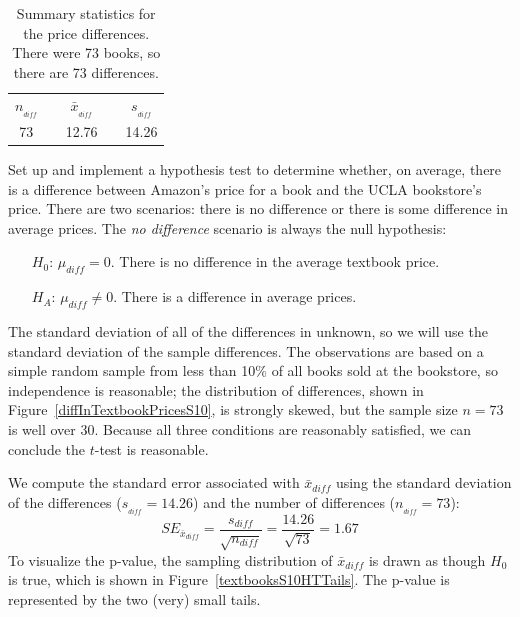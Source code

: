 \begin{table}[hh]
\centering
\begin{tabular}{ccccc}
\hline
$n_{_{diff}}$	&\hspace{3mm}& $\bar{x}_{_{diff}}$	&\hspace{3mm}& $s_{_{diff}}$ \vspace{1mm}\\
73			&& 12.76				&& 14.26 \\
\hline
\end{tabular}
\caption{Summary statistics for the price differences. There were 73 books, so there are 73 differences.}
\label{textbooksSummaryStats}
\end{table}

\begin{example}{Set up and implement a hypothesis test to determine whether, on average, there is a difference between Amazon's price for a book and the UCLA bookstore's price.}
\label{htForDiffInUCLAAndAmazonTextbookPrices}
There are two scenarios: there is no difference or there is some difference in average prices. The \emph{no difference} scenario is always the null hypothesis:
\begin{itemize}
\setlength{\itemsep}{0mm}
\item[$H_0$:] $\mu_{diff}=0$. There is no difference in the average textbook price.
\item[$H_A$:] $\mu_{diff} \neq 0$. There is a difference in average prices.
\end{itemize}
The standard deviation of all of the differences in unknown, so we will use the standard deviation of the sample differences. The observations are based on a simple random sample from less than 10\% of all books sold at the bookstore, so independence is reasonable; the distribution of differences, shown in Figure~\ref{diffInTextbookPricesS10}, is strongly skewed, but the sample size $n=73$ is well over 30. Because all three conditions are reasonably satisfied, we can conclude the $t$-test is reasonable.

We compute the standard error associated with $\bar{x}_{diff}$ using the standard deviation of the differences ($s_{_{diff}}=14.26$) and the number of differences ($n_{_{diff}}=73$):
$$SE_{\bar{x}_{diff}} = \frac{s_{diff}}{\sqrt{n_{diff}}} = \frac{14.26}{\sqrt{73}} = 1.67$$
To visualize the p-value, the sampling distribution of $\bar{x}_{diff}$ is drawn as though $H_0$ is true, which is shown in Figure~\ref{textbooksS10HTTails}. The p-value is represented by the two (very) small tails.


\end{example}

